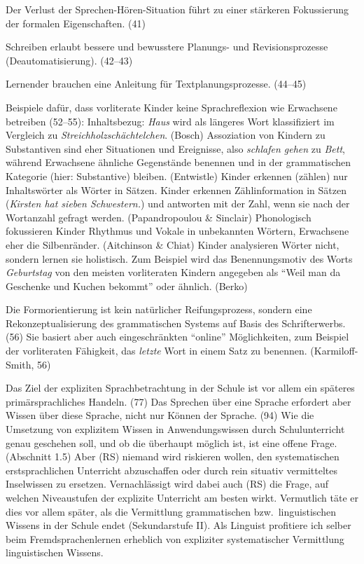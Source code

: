 Der Verlust der Sprechen-Hören-Situation führt zu einer stärkeren Fokussierung der formalen Eigenschaften. (41)

Schreiben erlaubt bessere und bewusstere Planungs- und Revisionsprozesse (Deautomatisierung). (42--43)

Lernender brauchen eine Anleitung für Textplanungsprozesse. (44--45)

Beispiele dafür, dass vorliterate Kinder keine Sprachreflexion wie Erwachsene betreiben (52--55):
Inhaltsbezug: \textit{Haus} wird als längeres Wort klassifiziert im Vergleich zu \textit{Streichholzschächtelchen}. (Bosch)
Assoziation von Kindern zu Substantiven sind eher Situationen und Ereignisse, also \textit{schlafen gehen} zu \textit{Bett}, während Erwachsene ähnliche Gegenstände benennen und in der grammatischen Kategorie (hier: Substantive) bleiben. (Entwistle)
Kinder erkennen (zählen) nur Inhaltswörter als Wörter in Sätzen.
Kinder erkennen Zählinformation in Sätzen (\textit{Kirsten hat sieben Schwestern.}) und antworten mit der Zahl, wenn sie nach der Wortanzahl gefragt werden. (Papandropoulou \& Sinclair)
Phonologisch fokussieren Kinder Rhythmus und Vokale in unbekannten Wörtern, Erwachsene eher die Silbenränder. (Aitchinson \& Chiat)
Kinder analysieren Wörter nicht, sondern lernen sie holistisch. Zum Beispiel wird das Benennungsmotiv des Worts \textit{Geburtstag} von den meisten vorliteraten Kindern angegeben als "`Weil man da Geschenke und Kuchen bekommt"' oder ähnlich. (Berko)

Die Formorientierung ist kein natürlicher Reifungsprozess, sondern eine Rekonzeptualisierung des grammatischen Systems auf Basis des Schrifterwerbs. (56)
Sie basiert aber auch eingeschränkten "`online"' Möglichkeiten, zum Beispiel der vorliteraten Fähigkeit, das \textit{letzte} Wort in einem Satz zu benennen. (Karmiloff-Smith, 56)

Das Ziel der expliziten Sprachbetrachtung in der Schule ist vor allem ein späteres primärsprachliches Handeln. (77)
Das Sprechen über eine Sprache erfordert aber Wissen über diese Sprache, nicht nur Können der Sprache. (94)
Wie die Umsetzung von explizitem Wissen in Anwendungswissen durch Schulunterricht genau geschehen soll, und ob die überhaupt möglich ist, ist eine offene Frage. (Abschnitt 1.5) Aber (RS) niemand wird riskieren wollen, den systematischen erstsprachlichen Unterricht abzuschaffen oder durch rein situativ vermitteltes Inselwissen zu ersetzen. Vernachlässigt wird dabei auch (RS) die Frage, auf welchen Niveaustufen der explizite Unterricht am besten wirkt. Vermutlich täte er dies vor allem später, als die Vermittlung grammatischen bzw.\ linguistischen Wissens in der Schule endet (Sekundarstufe II). Als Linguist profitiere ich selber \zB beim Fremdsprachenlernen erheblich von expliziter systematischer Vermittlung linguistischen Wissens.


